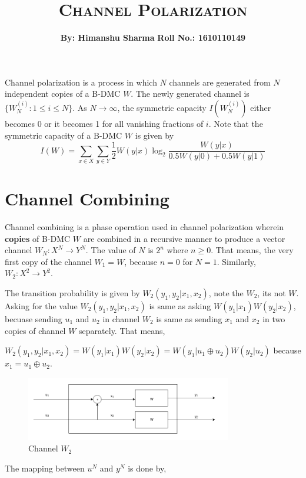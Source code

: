 \documentclass{article}
\title{\textsc{Channel Polarization}}
\author{\textbf{By: Himanshu Sharma}  \tab[6cm] \textbf{Roll No.: 1610110149}}
\date{}
\begin{document}
\maketitle
Channel polarization is a process in which $N$ channels are generated from $N$ independent copies of a B-DMC $W$. The newly generated channel is $\{W_{N}^{(i)}: 1 \leq i \leq N \}$. As $N \rightarrow \infty$, the symmetric capacity $I(W_{N}^{(i)})$ either becomes 0 or it becomes 1 for all vanishing fractions of $i$. Note that the symmetric capacity of a B-DMC $W$ is given by
\begin{equation}
I(W) = \sum_{x \in X}\sum_{y \in Y}\frac{1}{2}W(y|x)\log_{2}\frac{W(y|x)}{0.5W(y|0) + 0.5W(y|1)}
\end{equation}
\section{Channel Combining}
Channel combining is a phase operation used in channel polarization wherein \textbf{copies} of B-DMC $W$ are combined in a recursive manner to produce a vector channel $W_{N}: X^{N} \rightarrow Y^{N}$. The value of $N$ is $2^{n}$ where $n \geq 0$. That means, the very first copy of the channel $W_{1}=W$, because $n=0$ for $N=1$. Similarly, $W_{2}: X^{2} \rightarrow Y^{2}$.
\par The transition probability is given by $W_{2}(y_{1}, y_{2}|x_{1}, x_{2})$, note the $W_{2}$, its not $W$. Asking for the value $W_{2}(y_{1}, y_{2}|x_{1}, x_{2})$ is same as asking $W(y_{1}|x_{1})W(y_{2}|x_{2})$, becuase sending $u_{1}$ and $u_{2}$ in channel $W_{2}$ is same as sending $x_{1}$ and $x_{2}$ in two copies of channel $W$ separately. That means,
\begin{center}
$W_{2}(y_{1}, y_{2}|x_{1}, x_{2}) = W(y_{1}|x_{1})W(y_{2}|x_{2}) = W(y_{1}|u_{1}\oplus u_{2})W(y_{2}|u_{2})$ because $x_{1} = u_{1} \oplus u_{2}$.
\end{center}
\begin{figure}[H]
\centering
\includegraphics[width=0.8\textwidth, height=0.2\textheight]{twochannel.png}
\caption{Channel $W_{2}$}
\end{figure}
The mapping between $u^{N}$ and $y^{N}$ is done by,
\end{document}
